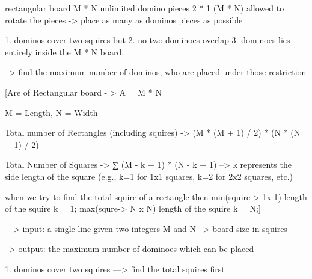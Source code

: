 rectangular board M * N
unlimited domino pieces 2 * 1 (M * N)
allowed to rotate the pieces -> place as many as dominos pieces as possible

1. dominos cover two squires but
2. no two dominoes overlap
3. dominoes lies entirely inside the M * N board.

--> find the maximum number of dominos, who are placed under those restriction

[Are of Rectangular board - > A = M * N

M = Length, N = Width

Total number of Rectangles (including squires) -> (M * (M + 1) / 2) * (N * (N + 1) / 2)

Total Number of Squares -> ∑ (M - k + 1) * (N - k + 1)
--> k represents the side length of the square (e.g., k=1 for 1x1 squares, k=2 for 2x2 squares, etc.)

when we try to find the total squire of a rectangle then
min(squire-> 1x 1) length of the squire k = 1;
max(squre-> N x N) length of the squire k = N;]


--->
input:
a single line given two integers M and N --> board size in squires

-->
output:
the maximum number of dominoes which can be placed

1. dominos cover two squires
---> find the total squires first
